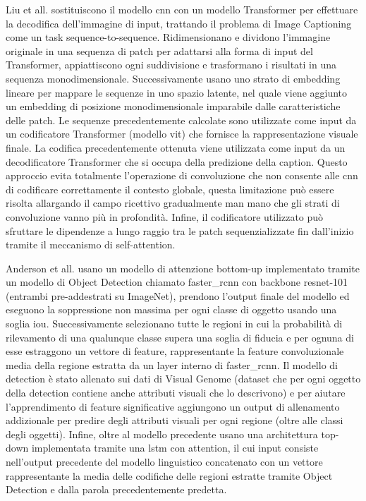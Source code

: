 Liu et all. \cite{liu2021cptr} sostituiscono il modello \acrshort{cnn} con un modello Transformer per effettuare la decodifica dell'immagine di input, trattando il problema di Image Captioning come un task sequence-to-sequence.
Ridimensionano e dividono l'immagine originale in una sequenza di patch per adattarsi alla forma di input del Transformer, appiattiscono ogni suddivisione e trasformano i risultati in una sequenza monodimensionale. Successivamente usano uno strato di embedding lineare per mappare le sequenze in uno spazio latente, nel quale viene aggiunto un embedding di posizione monodimensionale imparabile dalle caratteristiche delle patch. Le sequenze precedentemente calcolate sono utilizzate come input da un codificatore Transformer (modello \acrshort{vit}) che fornisce la rappresentazione visuale finale.
La codifica precedentemente ottenuta viene utilizzata come input da un decodificatore Transformer che si occupa della predizione della caption.
Questo approccio evita totalmente l'operazione di convoluzione che non consente alle \acrshort{cnn} di codificare correttamente il contesto globale, questa limitazione può essere risolta allargando il campo ricettivo gradualmente man mano che gli strati di convoluzione vanno più in profondità. Infine, il codificatore utilizzato può sfruttare le dipendenze a lungo raggio tra le patch sequenzializzate fin dall'inizio tramite il meccanismo di self-attention.

Anderson et all. \cite{anderson2018bottom} usano un modello di attenzione bottom-up implementato tramite un modello di Object Detection chiamato \acrshort{faster_rcnn} con backbone \acrshort{resnet}-101 (entrambi pre-addestrati su ImageNet), prendono l'output finale del modello ed eseguono la soppressione non massima per ogni classe di oggetto usando una soglia \acrshort{iou}. Successivamente selezionano tutte le regioni in cui la probabilità di rilevamento di una qualunque classe supera una soglia di fiducia e per ognuna di esse estraggono un vettore di feature, rappresentante la feature convoluzionale media della regione estratta da un layer interno di \acrshort{faster_rcnn}.
Il modello di detection è stato allenato sui dati di Visual Genome (dataset che per ogni oggetto della detection contiene anche attributi visuali che lo descrivono) e per aiutare l'apprendimento di feature significative aggiungono un output di allenamento addizionale per predire degli attributi visuali per ogni regione (oltre alle classi degli oggetti). 
Infine, oltre al modello precedente usano una architettura top-down implementata tramite una \acrshort{lstm} con attention, il cui input consiste nell'output precedente del modello linguistico concatenato con un vettore rappresentante la media delle codifiche delle regioni estratte tramite Object Detection e dalla parola precedentemente predetta. %

